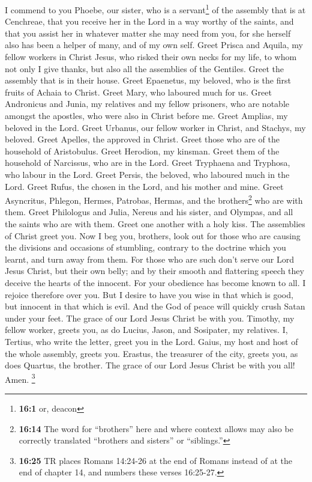  I commend to you Phoebe, our sister, who is a
servant\footnote{\textbf{16:1} or, deacon} of the assembly that is at
Cenchreae,  that you receive her in the Lord in a way
worthy of the saints, and that you assist her in whatever matter she may
need from you, for she herself also has been a helper of many, and of my
own self.  Greet Prisca and Aquila, my fellow workers in
Christ Jesus,  who risked their own necks for my life, to
whom not only I give thanks, but also all the assemblies of the
Gentiles.  Greet the assembly that is in their house.
Greet Epaenetus, my beloved, who is the first fruits of Achaia to
Christ.  Greet Mary, who laboured much for us.
 Greet Andronicus and Junia, my relatives and my fellow
prisoners, who are notable amongst the apostles, who were also in Christ
before me.  Greet Amplias, my beloved in the Lord.
 Greet Urbanus, our fellow worker in Christ, and Stachys,
my beloved.  Greet Apelles, the approved in Christ. Greet
those who are of the household of Aristobulus.  Greet
Herodion, my kinsman. Greet them of the household of Narcissus, who are
in the Lord.  Greet Tryphaena and Tryphosa, who labour in
the Lord. Greet Persis, the beloved, who laboured much in the Lord.
 Greet Rufus, the chosen in the Lord, and his mother and
mine.  Greet Asyncritus, Phlegon, Hermes, Patrobas,
Hermas, and the brothers\footnote{\textbf{16:14} The word for
  ``brothers'' here and where context allows may also be correctly
  translated ``brothers and sisters'' or ``siblings.''} who are with
them.  Greet Philologus and Julia, Nereus and his sister,
and Olympas, and all the saints who are with them.  Greet
one another with a holy kiss. The assemblies of Christ greet you.
 Now I beg you, brothers, look out for those who are
causing the divisions and occasions of stumbling, contrary to the
doctrine which you learnt, and turn away from them.  For
those who are such don't serve our Lord Jesus Christ, but their own
belly; and by their smooth and flattering speech they deceive the hearts
of the innocent.  For your obedience has become known to
all. I rejoice therefore over you. But I desire to have you wise in that
which is good, but innocent in that which is evil.  And
the God of peace will quickly crush Satan under your feet. The grace of
our Lord Jesus Christ be with you.  Timothy, my fellow
worker, greets you, as do Lucius, Jason, and Sosipater, my relatives.
 I, Tertius, who write the letter, greet you in the Lord.
 Gaius, my host and host of the whole assembly, greets
you. Erastus, the treasurer of the city, greets you, as does Quartus,
the brother.  The grace of our Lord Jesus Christ be with
you all! Amen.  \footnote{\textbf{16:25} TR places Romans
  14:24-26 at the end of Romans instead of at the end of chapter 14, and
  numbers these verses 16:25-27.}
